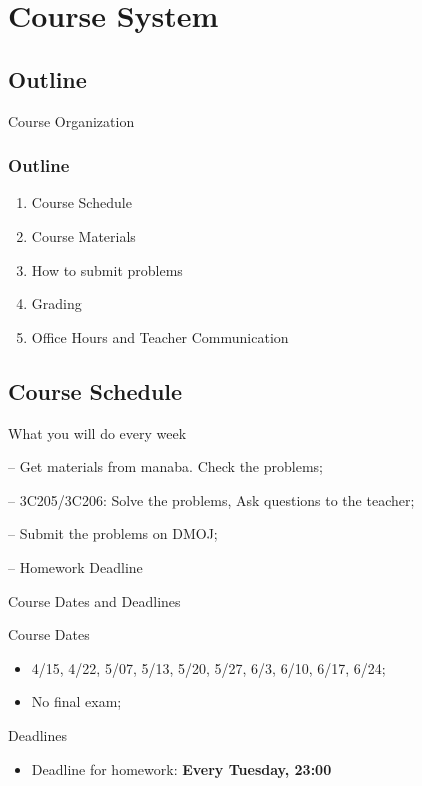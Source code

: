 
\section{Course System}
\subsection{Outline}

\begin{frame}
  \centering
  {\huge
    Course Organization
  }
\end{frame}

\begin{frame}
  \frametitle{Outline}
  \begin{enumerate}
    \item Course Schedule
    \item Course Materials
    \item How to submit problems
    \item Grading
    \item Office Hours and Teacher Communication
  \end{enumerate}
\end{frame}

\subsection{Course Schedule}
\begin{frame}{What you will do every week}
  \begin{description}
    \item[Monday] -- Get materials from \alert{manaba}. Check the problems;
    \medskip
    \item[Tuesday] -- 3C205/3C206: Solve the problems, Ask questions to the teacher;
    \medskip
    \item[Entire Week] -- Submit the problems on \alert{DMOJ};
    \medskip
    \item[Next Tuesday] -- Homework Deadline
  \end{description}
\end{frame}

\begin{frame}{Course Dates and Deadlines}
  \begin{block}{Course Dates}
    \begin{itemize}
    \item 4/15, 4/22, 5/07, 5/13, 5/20, 5/27, 6/3, 6/10, 6/17, 6/24;
    \item No final exam;
    \end{itemize}
  \end{block}
  \begin{block}{Deadlines}
    \begin{itemize}
      \item Deadline for homework: {\bf Every Tuesday, 23:00}
    \end{itemize}
  \end{block}
\end{frame}

